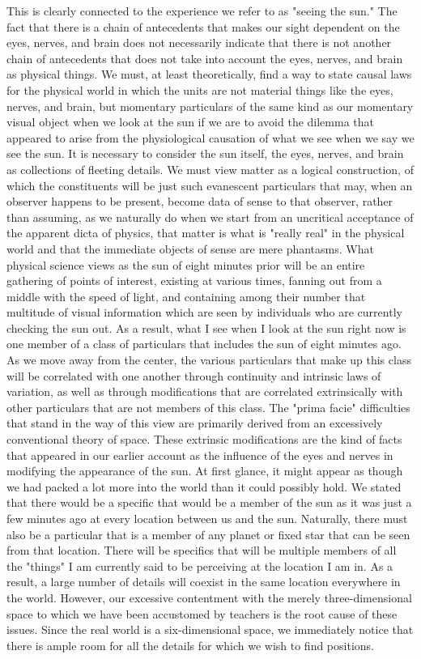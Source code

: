 \documentclass[a4paper,12pt]{book}[2004/02/16]
\theoremstyle{ilemma}
\theoremstyle{itheorem}
\theoremstyle{iother}
\theoremstyle{icorollary}
\theoremstyle{numcorollary}
\theoremstyle{idefinition}
\begin{document}
This is clearly connected to the experience we refer to as "seeing the sun." The fact that there is a chain of antecedents that makes our sight dependent on the eyes, nerves, and brain does not necessarily indicate that there is not another chain of antecedents that does not take into account the eyes, nerves, and brain as physical things. We must, at least theoretically, find a way to state causal laws for the physical world in which the units are not material things like the eyes, nerves, and brain, but momentary particulars of the same kind as our momentary visual object when we look at the sun if we are to avoid the dilemma that appeared to arise from the physiological causation of what we see when we say we see the sun. It is necessary to consider the sun itself, the eyes, nerves, and brain as collections of fleeting details. We must view matter as a logical construction, of which the constituents will be just such evanescent particulars that may, when an observer happens to be present, become data of sense to that observer, rather than assuming, as we naturally do when we start from an uncritical acceptance of the apparent dicta of physics, that matter is what is "really real" in the physical world and that the immediate objects of sense are mere phantasms. What physical science views as the sun of eight minutes prior will be
an entire gathering of points of interest, existing at various times,
fanning out from a middle with the speed of light, and containing
among their number that multitude of visual information which are seen by individuals who
are currently checking the sun out. As a result, what I see when I look at the sun right now is one member of a class of particulars that includes the sun of eight minutes ago. As we move away from the center, the various particulars that make up this class will be correlated with one another through continuity and intrinsic laws of variation, as well as through modifications that are correlated extrinsically with other particulars that are not members of this class. The "prima facie" difficulties that stand in the way of this view are primarily derived from an excessively conventional theory of space. These extrinsic modifications are the kind of facts that appeared in our earlier account as the influence of the eyes and nerves in modifying the appearance of the sun. At first glance, it might appear as though we had packed a lot more into the world than it could possibly hold. We stated that there would be a specific that would be a member of the sun as it was just a few minutes ago at every location between us and the sun. Naturally, there must also be a particular that is a member of any planet or fixed star that can be seen from that location. There will be specifics that will be multiple members of all the "things" I am currently said to be perceiving at the location I am in. As a result, a large number of details will coexist in the same location everywhere in the world. However, our excessive contentment with the merely three-dimensional space to which we have been accustomed by teachers is the root cause of these issues. Since the real world is a six-dimensional space, we immediately notice that there is ample room for all the details for which we wish to find positions.
\end{document}
